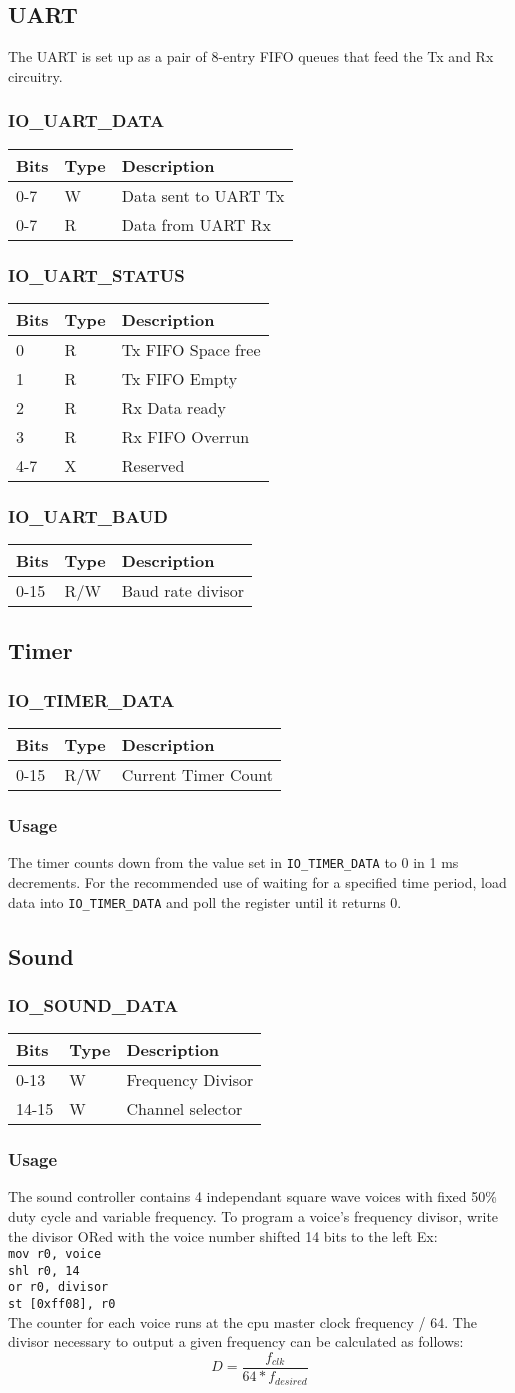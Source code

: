 \documentclass{article}
\newcommand{\regdesc}[2]{
  \subsubsection{#1}
  \begin{tabular}{|l|l|l|}
    \hline
    Bits & Type & Description \\ \hline
    #2
  \end{tabular}
}
\begin{document}
        \subsection{UART}
        The UART is set up as a pair of 8-entry FIFO queues that feed the Tx and Rx circuitry. \\

        \regdesc{IO\_UART\_DATA}{
        0-7 & W & Data sent to UART Tx \\ \hline
        0-7 & R & Data from UART Rx \\ \hline
        }
        \regdesc{IO\_UART\_STATUS}{
        0 & R & Tx FIFO Space free \\ \hline
        1 & R & Tx FIFO Empty \\ \hline
        2 & R & Rx Data ready \\ \hline
        3 & R & Rx FIFO Overrun \\ \hline
        4-7 & X & Reserved \\ \hline
        }

        \regdesc{IO\_UART\_BAUD}{
        0-15 & R/W & Baud rate divisor \\ \hline
        }
        \subsection{Timer}
        \regdesc{IO\_TIMER\_DATA}{
          0-15 & R/W & Current Timer Count \\ \hline
        }
        \subsubsection{Usage}
        The timer counts down from the value set in \texttt{IO\_TIMER\_DATA} to
        0 in 1 ms decrements.  For the recommended use of waiting for a
        specified time period, load data into \texttt{IO\_TIMER\_DATA} and poll
        the register until it returns 0.
        \subsection{Sound}
        \regdesc{IO\_SOUND\_DATA}{
          0-13 & W & Frequency Divisor \\ \hline
          14-15 & W & Channel selector \\ \hline
        }
        \subsubsection{Usage}
        The sound controller contains 4 independant square wave voices with fixed 50\% duty
        cycle and variable frequency. To program a voice's frequency divisor,
        write the divisor ORed with the voice number shifted 14 bits to the left
        Ex: \\ \texttt{mov r0, voice\\ shl r0, 14 \\ or r0, divisor \\ st
          [0xff08], r0} \\
        The counter for each voice runs at the cpu master clock frequency /
        64. The divisor necessary to output a given frequency can be calculated
        as follows: $$D=\frac{f_{clk}}{64*f_{desired}}$$
\end{document}
